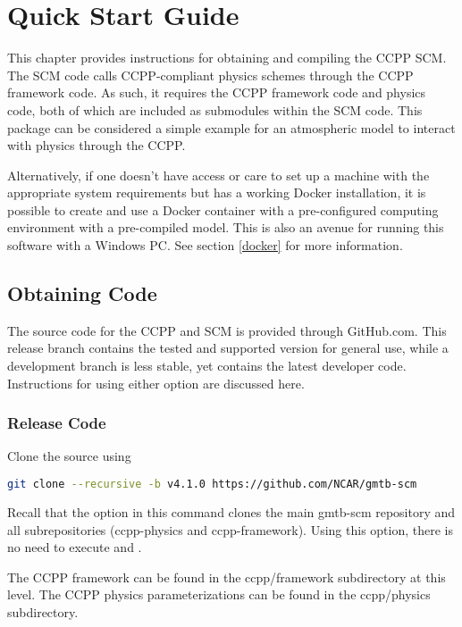 \chapter{Quick Start Guide}
\label{chapter: quick}

This chapter provides instructions for obtaining and compiling the CCPP SCM. The SCM code calls CCPP-compliant physics schemes through the CCPP framework code. As such, it requires the CCPP framework code and physics code, both of which are included as submodules within the SCM code. This package can be considered a simple example for an atmospheric model to interact with physics through the CCPP.

Alternatively, if one doesn't have access or care to set up a machine with the appropriate system requirements but has a working Docker installation, it is possible to create and use a Docker container with a pre-configured computing environment with a pre-compiled model. This is also an avenue for running this software with a Windows PC. See section \ref{docker} for more information.

\section{Obtaining Code}
\label{obtaining_code}

The source code for the CCPP and SCM is provided through GitHub.com.  This release branch contains the tested and supported version for general use, while a development branch is less stable, yet contains the latest developer code. Instructions for using either option are discussed here.

\subsection{Release Code}

Clone the source using
\begin{lstlisting}[language=bash]
git clone --recursive -b v4.1.0 https://github.com/NCAR/gmtb-scm
\end{lstlisting}
             Recall that the  option in this command clones the main gmtb-scm repository and all subrepositories (ccpp-physics and ccpp-framework). Using this option, there is no need to execute  and .

The CCPP framework can be found in the ccpp/framework subdirectory at this level.  The CCPP physics parameterizations can be found in the ccpp/physics subdirectory.

